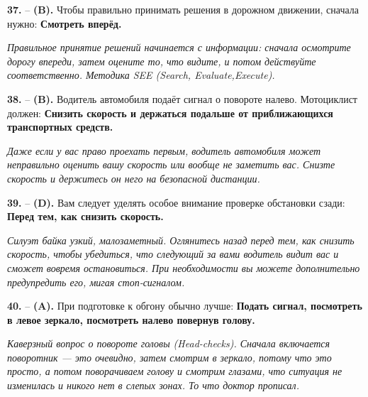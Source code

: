 \begin{minipage}{\linewidth}
\noindent\textbf{37.}  -- \textbf {(B).} Чтобы правильно принимать решения в дорожном движении, сначала нужно:  \textbf {Смотреть вперёд.} \par \textit {Правильное принятие решений начинается с информации: сначала осмотрите дорогу впереди, затем оцените то, что видите, и потом действуйте соответственно. Методика SEE (Search, Evaluate,Execute).} \\
\end{minipage}

\begin{minipage}{\linewidth}
\noindent\textbf{38.}  -- \textbf {(B).} Водитель автомобиля подаёт сигнал о повороте налево. Мотоциклист должен:  \textbf {Снизить скорость и держаться подальше от приближающихся транспортных средств.} \par \textit {Даже если у вас право проехать первым, водитель автомобиля может неправильно оценить вашу скорость или вообще не заметить вас. Снизте скорость и держитесь он него на безопасной дистанции.} \\
\end{minipage}

\begin{minipage}{\linewidth}
\noindent\textbf{39.}  -- \textbf {(D).} Вам следует уделять особое внимание проверке обстановки сзади:  \textbf {Перед тем, как снизить скорость.} \par \textit {Силуэт байка узкий, малозаметный. Оглянитесь назад перед тем, как снизить скорость, чтобы убедиться, что следующий за вами водитель видит вас и сможет вовремя остановиться. При необходимости вы можете дополнительно предупредить его, мигая стоп-сигналом.} \\
\end{minipage}

\begin{minipage}{\linewidth}
\noindent\textbf{40.}  -- \textbf {(A).} При подготовке к обгону обычно лучше:  \textbf {Подать сигнал, посмотреть в левое зеркало,  посмотреть налево повернув голову.} \par \textit {Каверзный вопрос о повороте головы (Head-checks). Сначала включается поворотник — это очевидно, затем смотрим в зеркало, потому что это просто, а потом поворачиваем голову и смотрим глазами, что ситуация не изменилась и никого нет в слепых зонах. То что доктор прописал.} \\
\end{minipage}

